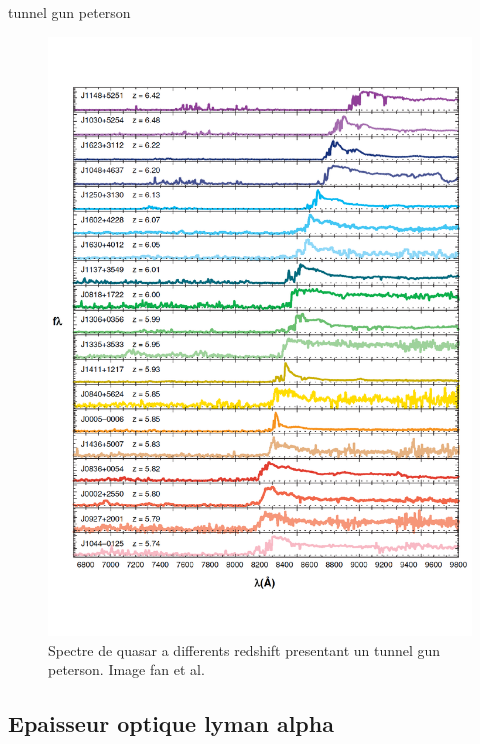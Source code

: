 tunnel gun peterson
\begin{figure}[bth]
        \includegraphics[width=.95\linewidth]{img/01/quasar_spectre.pdf} 
        \caption{Spectre de quasar a differents redshift presentant un tunnel gun peterson.
        Image fan et al.}
 		\label{fig:spectre_quasar}
\end{figure}

\subsection{Epaisseur optique lyman alpha}

